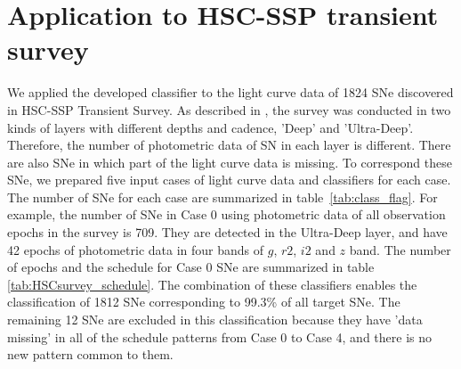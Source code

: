 \documentclass[useamsfonts]{pasj01}
\begin{document}
\section{Application to HSC-SSP transient survey}
\label{sec:h}
%
We applied the developed classifier to the light curve data of 1824 SNe discovered in HSC-SSP Transient Survey.
As described in \citet{yasuda19a}, the survey %
was conducted in two kinds of layers with different depths and cadence, 
'Deep' and 'Ultra-Deep'.
Therefore, the number of photometric data of SN in each layer is different.
There are also SNe in which part of the light curve data is missing.
To correspond these SNe, we prepared five input cases of light curve data and classifiers for each case.
The number of SNe for each case are summarized in table\ \ref{tab:class_flag}.
For example, the number of SNe in Case 0 using photometric data of all observation epochs in the survey is 709.
They are detected in the Ultra-Deep layer, and have 42 epochs of photometric data in four bands of $g$, $r2$, $i2$ and $z$ band.
The number of epochs and the schedule for Case 0 SNe are summarized in table \ref{tab:HSCsurvey_schedule}.
The combination of these classifiers enables the classification of 1812 SNe corresponding to 99.3\% of all target SNe.
The remaining 12 SNe are excluded in this classification because they have 'data missing' in all of the schedule patterns from Case 0 to Case 4, and there is no new pattern common to them.
\end{document}
